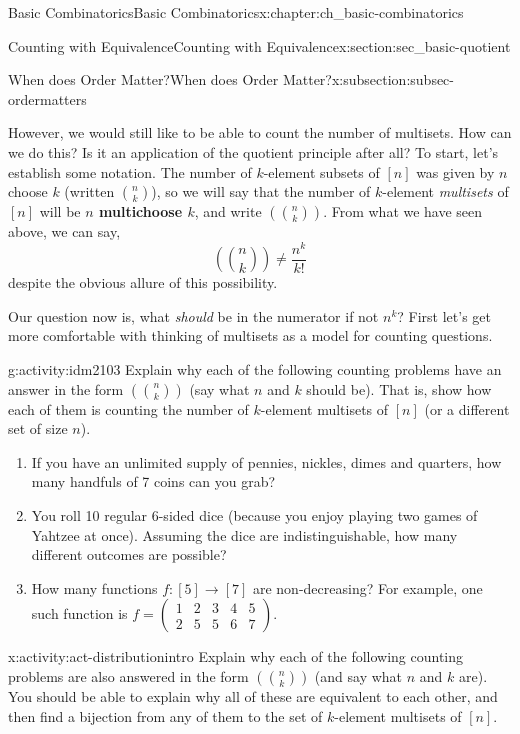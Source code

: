 \documentclass[oneside,10pt,]{book}
\newcommand{\terminology}[1]{\textbf{#1}}
\numberwithin{equation}{chapter}
\newcommand{\mchoose}[2]{\left(\!\binom{#1}{#2}\!\right)}
\newcommand{\twoline}[2]{\begin{pmatrix}#1 \\ #2 \end{pmatrix}}
\newcommand{\amp}{&}
\begin{document}
\begin{chapterptx}{Basic Combinatorics}{}{Basic Combinatorics}{}{}{x:chapter:ch_basic-combinatorics}
\begin{sectionptx}{Counting with Equivalence}{}{Counting with Equivalence}{}{}{x:section:sec_basic-quotient}
\begin{subsectionptx}{When does Order Matter?}{}{When does Order Matter?}{}{}{x:subsection:subsec-ordermatters}
\par
However, we would still like to be able to count the number of multisets.  How can we do this?  Is it an application of the quotient principle after all?  To start, let's establish some notation.  The number of \(k\)-element subsets of \([n]\) was given by \(n\) choose \(k\) (written \(\binom{n}{k}\)), so we will say that the number of \(k\)-element \emph{multisets} of \([n]\) will be \terminology{\(n\) multichoose \(k\)}, and write \(\mchoose{n}{k}\).  From what we have seen above, we can say,%
\begin{equation*}
\mchoose{n}{k} \ne \frac{n^k}{k!}
\end{equation*}
despite the obvious allure of this possibility.%
\par
Our question now is, what \emph{should} be in the numerator if not \(n^k\)?  First let's get more comfortable with thinking of multisets as a model for counting questions.%
\begin{activity}{}{g:activity:idm2103}%
Explain why each of the following counting problems have an answer in the form \(\mchoose{n}{k}\) (say what \(n\) and \(k\) should be).  That is, show how each of them is counting the number of \(k\)-element multisets of \([n]\) (or a different set of size \(n\)).%
\begin{enumerate}[font=\bfseries,label=(\alph*),ref=\alph*]
\item{}If you have an unlimited supply of pennies, nickles, dimes and quarters, how many handfuls of 7 coins can you grab?%
\item{}You roll 10 regular 6-sided dice (because you enjoy playing two games of Yahtzee at once).  Assuming the dice are indistinguishable, how many different outcomes are possible?%
\item{}How many functions \(f:[5] \to [7]\) are non-decreasing?  For example, one such function is \(f = \twoline{1 \amp 2 \amp 3 \amp 4 \amp 5}{2 \amp 5 \amp 5 \amp 6 \amp 7}\).%
\end{enumerate}
\end{activity}
\begin{activity}{}{x:activity:act-distributionintro}%
Explain why each of the following counting problems are also answered in the form \(\mchoose{n}{k}\) (and say what \(n\) and \(k\) are).  You should be able to explain why all of these are equivalent to each other, and then find a bijection from any of them to the set of \(k\)-element multisets of \([n]\).%
\begin{enumerate}[font=\bfseries,label=(\alph*),ref=\alph*]

\end{enumerate}
\end{activity}
\end{subsectionptx}
\end{sectionptx}
\end{chapterptx}
\end{document}
